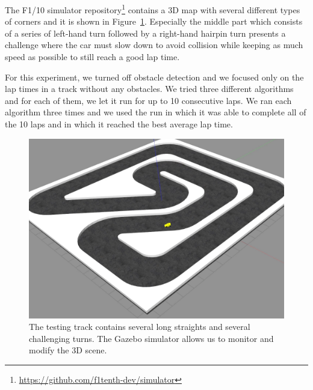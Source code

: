 The F1/10 simulator repository\footnote{\url{https://github.com/f1tenth-dev/simulator}} contains a 3D map with several different types of corners and it is shown in Figure~\ref{fig:gazebo-track}. Especially the middle part which consists of a series of left-hand turn followed by a right-hand hairpin turn presents a challenge where the car must slow down to avoid collision while keeping as much speed as possible to still reach a good lap time.

For this experiment, we turned off obstacle detection and we focused only on the lap times in a track without any obstacles. We tried three different algorithms and for each of them, we let it run for up to 10 consecutive laps. We ran each algorithm three times and we used the run in which it was able to complete all of the 10 laps and in which it reached the best average lap time.

\begin{figure}
	\label{fig:gazebo-track}
	\centering
	\includegraphics[width=\textwidth]{../img/experiments/gazebo-track.png}
	\caption{The testing track contains several long straights and several challenging turns. The Gazebo simulator allows us to monitor and modify the 3D scene.}
\end{figure}

